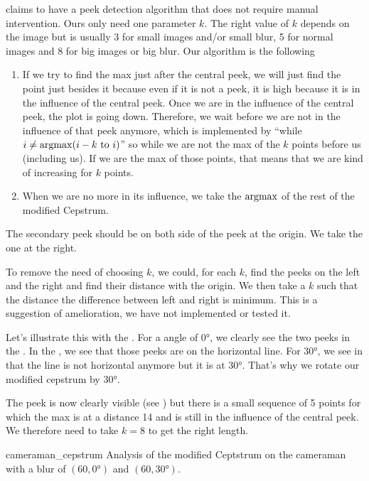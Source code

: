 \cite{Deshpande2014606} claims to have a peek detection
algorithm that does not require manual intervention.
Ours only need one parameter $k$.
The right value of $k$ depends on the image but is
usually 3 for small images and/or small blur,
5 for normal images and 8 for big images or big blur.
Our algorithm is the following
\begin{enumerate}
  \item If we try to find the max just after the central peek,
    we will just find the point just besides it because even
    if it is not a peek, it is high because it is in the
    influence of the central peek.
    Once we are in the influence of the central peek,
    the plot is going down.
    Therefore, we wait before we are not in the influence of that peek
    anymore, which is implemented by
    ``while $i \neq \operatorname{argmax}(i-k\text{ to }i)$'' so
    while we are not the max of the $k$ points before us
    (including us).
    If we are the max of those points,
    that means that we are kind of increasing for $k$
    points.
  \item When we are no more in its influence, we take the
    $\operatorname{argmax}$ of the rest of the modified Cepstrum.
\end{enumerate}

The secondary peek should be on both side of the peek at the
origin.
We take the one at the right.

To remove the need of choosing $k$, we could,
for each $k$, find the peeks on the left and the right and
find their distance with the origin.
We then take a $k$ such that the distance
the difference between left and right is minimum.
This is a suggestion of amelioration,
we have not implemented or tested it.

Let's illustrate this with the .
For a angle of \ang{0}, we clearly see the two peeks
in the .
In the ,
we see that those peeks are on the horizontal line.
For \ang{30}, we see in 
that the line is not horizontal anymore but it is at \ang{30}.
That's why we rotate our modified cepstrum by \ang{30}.

The peek is now clearly visible (see ) but
there is a small sequence of 5 points for which the max is at a distance
14 and is still in the influence of the central peek.
We therefore need to take $k = 8$ to get the right length.

\begin{myfig}{cameraman_cepstrum}
  {Analysis of the modified Ceptstrum on the cameraman with a blur of $(60,\ang{0})$ and $(60,\ang{30})$.}
\end{myfig}
